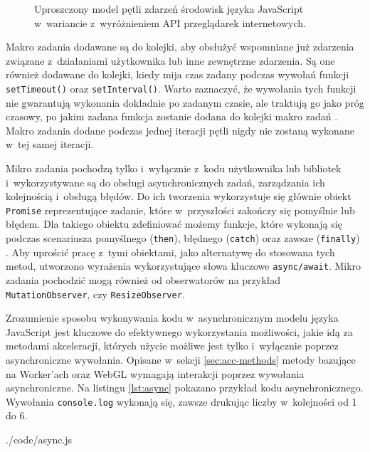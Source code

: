 \begin{figure}[ht]
    \centering
    
    \caption{Uproszczony model pętli zdarzeń środowisk języka JavaScript w~wariancie z~wyróżnieniem API przeglądarek internetowych.}
    \label{fig:event-loop}
\end{figure}


Makro zadania dodawane są do kolejki, aby obsłużyć wspomniane już zdarzenia związane z~działaniami użytkownika lub inne zewnętrzne zdarzenia. Są one również dodawane do kolejki, kiedy mija czas zadany podczas wywołań funkcji \lstinline{setTimeout()} oraz \lstinline{setInterval()}. Warto zaznaczyć, że wywołania tych funkcji nie gwarantują wykonania dokładnie po zadanym czasie, ale traktują go jako próg czasowy, po jakim zadana funkcja zostanie dodana do kolejki makro zadań \cite{setTimeout}. Makro zadania dodane podczas jednej iteracji pętli nigdy nie zostaną wykonane w~tej samej iteracji.

Mikro zadania pochodzą tylko i~wyłącznie z~kodu użytkownika lub bibliotek i~wykorzystywane są do obsługi asynchronicznych zadań, zarządzania ich kolejnością i~obsługą błędów\cite{runtime}. Do ich tworzenia wykorzystuje się głównie obiekt \lstinline{Promise} reprezentujące zadanie, które w~przyszłości zakończy się pomyślnie lub błędem. Dla takiego obiektu zdefiniować możemy funkcje, które wykonają się podczas scenariusza pomyślnego (\lstinline{then}), błędnego (\lstinline{catch}) oraz zawsze (\lstinline{finally}) \cite{promise}. Aby uprościć pracę z~tymi obiektami, jako alternatywę do stosowana tych metod, utworzono wyrażenia wykorzystujące słowa kluczowe \lstinline{async/await}. Mikro zadania pochodzić mogą również od obserwatorów na przykład \lstinline{MutationObserver}, czy \lstinline{ResizeObserver}. 

Zrozumienie sposobu wykonywania kodu w~asynchronicznym modelu języka JavaScript jest kluczowe do efektywnego wykorzystania możliwości, jakie idą za metodami akceleracji, których użycie możliwe jest tylko i~wyłącznie poprzez asynchroniczne wywołania. Opisane w~sekcji \ref{sec:acc-methods} metody bazujące na Worker'ach oraz WebGL wymagają interakcji poprzez wywołania asynchroniczne. Na listingu \ref{lst:async} pokazano przykład kodu asynchronicznego. Wywołania \mbox{\lstinline{console.log}} wykonają się, zawsze drukując liczby w~kolejności od 1 do 6.

 {./code/async.js}


